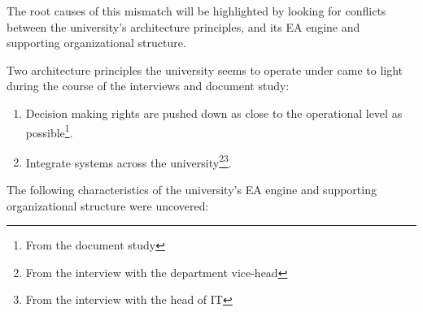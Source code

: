 The root causes of this mismatch will be highlighted by looking for conflicts between the university's architecture principles, and its EA engine and supporting organizational structure. 

Two architecture principles the university seems to operate under came to light during the course of the interviews and document study:

\begin{enumerate}
\item Decision making rights are pushed down as close to the operational level as possible\footnote{From the document study\label{fn:document}}.
\item Integrate systems across the university\footnote{From the interview with the department vice-head\label{fn:interviewHead}}\footnote{From the interview with the head of IT\label{fn:interviewIT}}.
\end{enumerate}

The following characteristics of the university's EA engine and supporting organizational structure were uncovered: 

